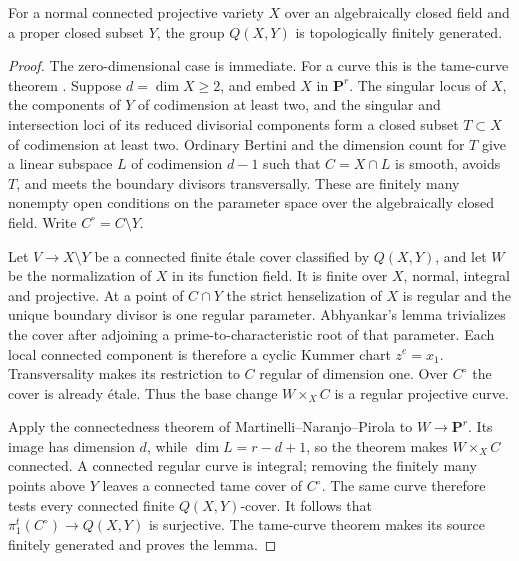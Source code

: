 \begin{lemma}\label{lem:projective}
For a normal connected projective variety $X$ over an algebraically
closed field and a proper closed subset $Y$, the group $Q(X,Y)$ is
topologically finitely generated.
\end{lemma}
\begin{proof}
The zero-dimensional case is immediate. For a curve this is the
tame-curve theorem \cite[XIII, Corollary 2.12,
pp.~392--395]{SGA1}. Suppose $d=\dim X\ge2$, and embed
$X$ in $\mathbf P^r$. The singular locus of $X$, the components
of $Y$ of codimension at least two, and the singular and intersection
loci of its reduced divisorial components form a closed subset
$T\subset X$ of codimension at least two. Ordinary Bertini and
the dimension count for $T$ give a linear subspace $L$ of
codimension $d-1$ such that $C=X\cap L$ is smooth, avoids $T$,
and meets the boundary divisors transversally. These are finitely
many nonempty open conditions on the parameter space over the
algebraically closed field. Write $C^\circ=C\setminus Y$.

Let $V\to X\setminus Y$ be a connected finite \'etale cover
classified by $Q(X,Y)$, and let $W$ be the normalization of $X$
in its function field. It is finite over $X$, normal, integral
and projective. At a point of $C\cap Y$ the strict henselization
of $X$ is regular and the unique boundary divisor is one regular
parameter. Abhyankar's lemma
\cite[XIII, Proposition 5.2, pp.~428--429]{SGA1} trivializes the
cover after adjoining a prime-to-characteristic root of that
parameter. Each local connected component is therefore a cyclic
Kummer chart $z^e=x_1$. Transversality makes its restriction to
$C$ regular of dimension one. Over $C^\circ$ the cover is already
\'etale. Thus the base change $W\times_X C$ is a regular
projective curve.

Apply the connectedness theorem of Martinelli--Naranjo--Pirola
\cite[Theorem 1.1, p.~31]{MNP} to $W\to\mathbf P^r$.
Its image has dimension $d$, while $\dim L=r-d+1$, so the
theorem makes $W\times_X C$ connected. A connected regular
curve is integral; removing the finitely many points above $Y$
leaves a connected tame cover of $C^\circ$. The same curve
therefore tests every connected finite $Q(X,Y)$-cover. It follows
that $\pi_1^t(C^\circ)\to Q(X,Y)$ is surjective. The tame-curve
theorem makes its source finitely generated and proves the lemma.
\end{proof}

